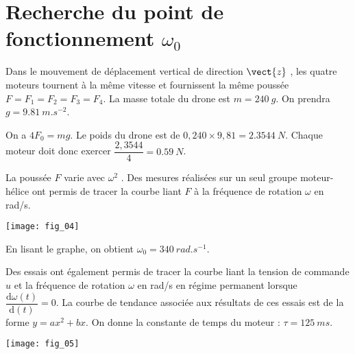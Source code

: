 \section*{Recherche du point de fonctionnement $\omega_0$}
\ifprof
\else
Dans le mouvement de déplacement vertical de direction $\vect{z}$ , les quatre moteurs tournent à la même vitesse et fournissent la même poussée $F=F_1=F_2=F_3=F_4$.
La masse totale du drone est $m=\SI{240}{g}$. On prendra $g=\SI{9,81}{m.s^{-2}}$.
\fi


\ifprof
\begin{corrige}
On a  $4 F_0 = mg$. 
Le poids du drone est de $0,240\times 9,81 = \SI{2,3544}{N}$. Chaque moteur doit donc exercer $\dfrac{2,3544}{4}=\SI{0,59}{N}$.
\end{corrige}
\else
\fi
\ifprof
\else
La poussée $F$ varie avec $\omega^2$ . Des mesures réalisées sur un seul groupe moteur-hélice ont permis de tracer la courbe liant $F$ à la fréquence de rotation $\omega$ en rad/s.

\begin{marginfigure}
\texttt{[image: fig\_04]}
\end{marginfigure}

\fi

\ifprof
\begin{corrige}
En lisant le graphe, on obtient $\omega_0=\SI{340}{rad.s^{-1}}$.
\end{corrige}
\else
\fi

\ifprof
\else

Des essais ont également permis de tracer la
courbe liant la tension de commande $u$ et la
fréquence de rotation $\omega$ en rad/s en régime
permanent lorsque $\dfrac{\text{d}\omega(t)}{\text{d}(t)}=0$. La courbe de tendance associée aux résultats de
ces essais est de la forme $y=ax^2+bx$. On donne la constante de temps du moteur :
$\tau=\SI{125}{ms}$.

\begin{marginfigure}
\texttt{[image: fig\_05]}
\end{marginfigure}
\fi

